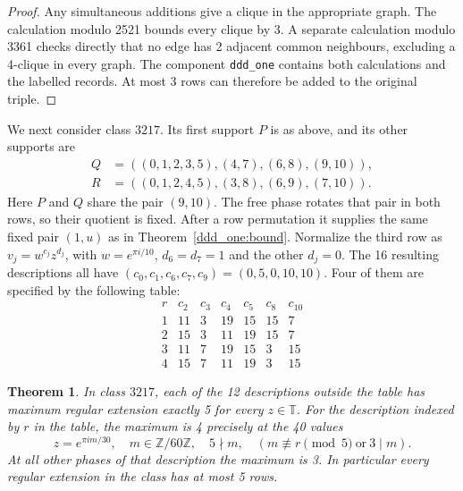\documentclass[11pt,a4paper]{article}
\newtheorem{theorem}{Theorem}[section]
\theoremstyle{plain}
\theoremstyle{definition}
\theoremstyle{plain}
\begin{document}
\begin{proof}
Any simultaneous additions give a clique in the appropriate graph. The calculation modulo 2521 bounds every clique by 3. A separate calculation modulo 3361 checks directly that no edge has 2 adjacent common neighbours, excluding a 4-clique in every graph. The component \texttt{ddd\_one} contains both calculations and the labelled records. At most 3 rows can therefore be added to the original triple.
\end{proof}

We next consider class $3217$. Its first support $P$ is as above, and its other supports are
$$\begin{aligned}
Q&=((0,1,2,3,5),(4,7),(6,8),(9,10)),\\
R&=((0,1,2,4,5),(3,8),(6,9),(7,10)).
\end{aligned}$$
Here $P$ and $Q$ share the pair $(9,10)$. The free phase rotates that pair in both rows, so their quotient is fixed. After a row permutation it supplies the same fixed pair $(1,u)$ as in Theorem~\ref{ddd_one:bound}. Normalize the third row as $v_j=w^{c_j}z^{d_j}$, with $w=e^{\pi i/10}$, $d_6=d_7=1$ and the other $d_j=0$. The 16 resulting descriptions all have $(c_0,c_1,c_6,c_7,c_9)=(0,5,0,10,10)$. Four of them are specified by the following table:
$$\begin{array}{c|rrrrrr}
r&c_2&c_3&c_4&c_5&c_8&c_{10}\\\hline
1&11&3&19&15&15&7\\
2&15&3&11&19&15&7\\
3&11&7&19&15&3&15\\
4&15&7&11&19&3&15
\end{array}$$

\par\addvspace{\medskipamount}\noindent
\begin{minipage}{\linewidth}
\begin{theorem}\label{ddd_one:3217}
In class $3217$, each of the 12 descriptions outside the table has maximum regular extension exactly 5 for every $z\in\mathbb T$. For the description indexed by $r$ in the table, the maximum is 4 precisely at the 40 values
$$z=e^{\pi i m/30},\quad m\in\mathbb Z/60\mathbb Z,\quad
5\nmid m,\quad (m\not\equiv r\pmod5\ \text{or}\ 3\mid m).$$
At all other phases of that description the maximum is 3. In particular every regular extension in the class has at most 5 rows.
\end{theorem}
\end{minipage}
\par\addvspace{\medskipamount}
\end{document}
